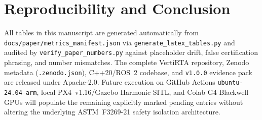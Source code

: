 \documentclass[conference,10pt]{IEEEtran}
\begin{document}
\section{Reproducibility and Conclusion}
\label{sec:conclusion}

All tables in this manuscript are generated automatically from \texttt{docs/paper/metrics\_manifest.json} via \texttt{generate\_latex\_tables.py} and audited by \texttt{verify\_paper\_numbers.py} against placeholder drift, false certification phrasing, and number mismatches. The complete VertiRTA repository, Zenodo metadata (\texttt{.zenodo.json}), C++20/ROS~2 codebase, and \texttt{v1.0.0} evidence pack are released under Apache-2.0. Future execution on GitHub Actions \texttt{ubuntu-24.04-arm}, local PX4~v1.16/Gazebo Harmonic SITL, and Colab G4 Blackwell GPUs will populate the remaining explicitly marked pending entries without altering the underlying ASTM~F3269-21 safety isolation architecture.



\end{document}

